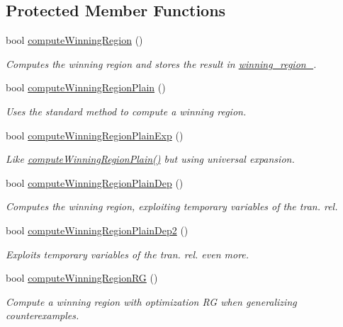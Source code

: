 \subsection*{Protected Member Functions}
\begin{DoxyCompactItemize}
\item 
bool \hyperlink{classLearnSynthSAT_a055b4699184d09bb7f6b15052ac684db}{compute\-Winning\-Region} ()
\begin{DoxyCompactList}\small\item\em Computes the winning region and stores the result in \hyperlink{classLearnSynthSAT_aced2bce789c7a93ed4b5391dd0690616}{winning\-\_\-region\-\_\-}. \end{DoxyCompactList}\item 
bool \hyperlink{classLearnSynthSAT_a49541a9cff8002ca31e0044ae35546a2}{compute\-Winning\-Region\-Plain} ()
\begin{DoxyCompactList}\small\item\em Uses the standard method to compute a winning region. \end{DoxyCompactList}\item 
bool \hyperlink{classLearnSynthSAT_a8727927b4e0432acb6bcea883fd2f1f9}{compute\-Winning\-Region\-Plain\-Exp} ()
\begin{DoxyCompactList}\small\item\em Like \hyperlink{classLearnSynthSAT_a49541a9cff8002ca31e0044ae35546a2}{compute\-Winning\-Region\-Plain()} but using universal expansion. \end{DoxyCompactList}\item 
bool \hyperlink{classLearnSynthSAT_a0d36fdd8180e9ba06e116b6ed3cb6a72}{compute\-Winning\-Region\-Plain\-Dep} ()
\begin{DoxyCompactList}\small\item\em Computes the winning region, exploiting temporary variables of the tran. rel. \end{DoxyCompactList}\item 
bool \hyperlink{classLearnSynthSAT_a7190dabde3f24ddb94c0484f7df3b026}{compute\-Winning\-Region\-Plain\-Dep2} ()
\begin{DoxyCompactList}\small\item\em Exploits temporary variables of the tran. rel. even more. \end{DoxyCompactList}\item 
bool \hyperlink{classLearnSynthSAT_aa981048565f10183c30c4dc0576de6b6}{compute\-Winning\-Region\-R\-G} ()
\begin{DoxyCompactList}\small\item\em Compute a winning region with optimization R\-G when generalizing counterexamples. \end{DoxyCompactList}\item 

\end{DoxyCompactItemize}
